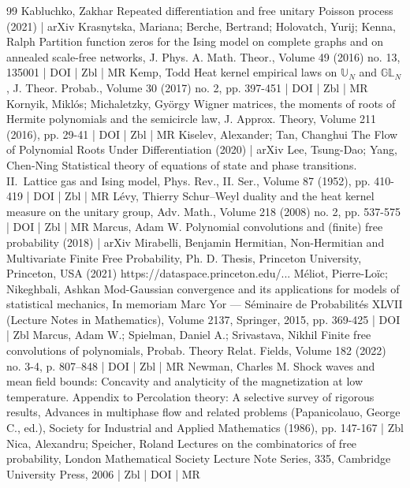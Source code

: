 \documentclass[10pt]{amsart}
\theoremstyle{definition}\newtheorem{defi}[theo]{Definition}\newtheorem{rema}[theo]{Remark}\newtheorem{exam}[theo]{Example}\newtheorem{exem}[theo]{Example}\newtheorem{nota}[theo]{Notation}
\begin{document}
\begin{thebibliography}{99}
Kabluchko, Zakhar Repeated differentiation and free unitary Poisson process (2021) | arXiv
Krasnytska, Mariana; Berche, Bertrand; Holovatch, Yurij; Kenna, Ralph Partition function zeros for the Ising model on complete graphs and on annealed scale-free networks, J. Phys. A. Math. Theor., Volume 49 (2016) no. 13, 135001 | DOI | Zbl | MR
Kemp, Todd Heat kernel empirical laws on $\mathbb{U}_{N}$ and $\mathbb{GL}_{N}$, J. Theor. Probab., Volume 30 (2017) no. 2, pp. 397-451 | DOI | Zbl | MR
Kornyik, Miklós; Michaletzky, György Wigner matrices, the moments of roots of Hermite polynomials and the semicircle law, J. Approx. Theory, Volume 211 (2016), pp. 29-41 | DOI | Zbl | MR
Kiselev, Alexander; Tan, Changhui The Flow of Polynomial Roots Under Differentiation (2020) | arXiv
Lee, Tsung-Dao; Yang, Chen-Ning Statistical theory of equations of state and phase transitions. II. Lattice gas and Ising model, Phys. Rev., II. Ser., Volume 87 (1952), pp. 410-419 | DOI | Zbl | MR
Lévy, Thierry Schur–Weyl duality and the heat kernel measure on the unitary group, Adv. Math., Volume 218 (2008) no. 2, pp. 537-575 | DOI | Zbl | MR
Marcus, Adam W. Polynomial convolutions and (finite) free probability (2018) | arXiv
Mirabelli, Benjamin Hermitian, Non-Hermitian and Multivariate Finite Free Probability, Ph. D. Thesis, Princeton University, Princeton, USA (2021) https://dataspace.princeton.edu/...
Méliot, Pierre-Loïc; Nikeghbali, Ashkan Mod-Gaussian convergence and its applications for models of statistical mechanics, In memoriam Marc Yor — Séminaire de Probabilités XLVII (Lecture Notes in Mathematics), Volume 2137, Springer, 2015, pp. 369-425 | DOI | Zbl
Marcus, Adam W.; Spielman, Daniel A.; Srivastava, Nikhil Finite free convolutions of polynomials, Probab. Theory Relat. Fields, Volume 182 (2022) no. 3-4, p. 807–848 | DOI | Zbl | MR
Newman, Charles M. Shock waves and mean field bounds: Concavity and analyticity of the magnetization at low temperature. Appendix to Percolation theory: A selective survey of rigorous results, Advances in multiphase flow and related problems (Papanicolauo, George C., ed.), Society for Industrial and Applied Mathematics (1986), pp. 147-167 | Zbl
Nica, Alexandru; Speicher, Roland Lectures on the combinatorics of free probability, London Mathematical Society Lecture Note Series, 335, Cambridge University Press, 2006 | Zbl | DOI | MR

\end{thebibliography}
\end{document}
